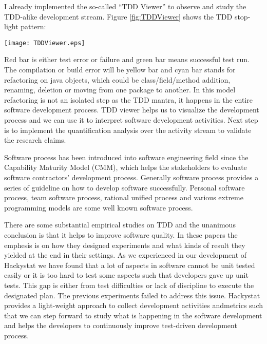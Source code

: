 \documentclass[11pt,twocolumn]{article}
\begin{document}
I already implemented the so-called ``TDD Viewer'' to observe and
study the TDD-alike development stream. Figure \ref{fig:TDDViewer} shows the
TDD stop-light pattern:

\begin{figure*}[ht] 
  \centering 
  \texttt{[image: TDDViewer.eps]}
  \caption{TDD Activity Stream on June 9, 2004}
  \label{fig:TDDViewer}
\end{figure*} 

Red bar is either test error or failure and green bar means successful test
run. The compilation or build error will be yellow bar and cyan bar stands
for refactoring on java objects, which could be class/field/method
addition, renaming, deletion or moving from one package to another. In this 
model refactoring is not an isolated step as the TDD mantra, it happens
in the entire software development process. TDD viewer helps us to
visualize the development process and we can use it to interpret
software development activities. Next step is to implement the
quantification analysis over the activity stream to validate the research claims. 

\label{sec:research}
Software process has been introduced into software engineering field since
the Capability Maturity Model (CMM), which helps the stakeholders to
evaluate software contractors' development process. Generally software
process provides a series of guideline on how to develop software
successfully. Personal software process, team software process, rational
unified process and various extreme programming models are some well known
software process.

There are some substantial empirical studies on TDD and the unanimous
conclusion is that it helps to improve software quality. In these papers
the emphesis is on how they designed experiments and what kinds of result
they yielded at the end in their settings. As we experienced in our
development of Hackystat we have found that a lot of aspects in software
cannot be unit tested easily or it is too hard to test some aspects such
that developers gave up unit tests. This gap is either from test
difficulties or lack of discipline to execute the designated plan. The
previous experiments failed to address this issue. Hackystat provides a
light-weight approach to collect development activities andmetrics such
that we can step forward to study what is happening in the software
development and helps the developers to continuously improve test-driven
development process.
\end{document}
